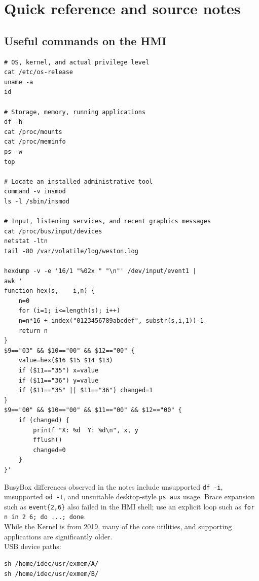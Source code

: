 \documentclass[10pt,letterpaper]{article}
\newcommand{\file}[1]{\nolinkurl{#1}}
\begin{document}
\newpage
\section{Quick reference and source notes}\label{refs}
\subsection{Useful commands on the HMI}
\begin{lstlisting}
# OS, kernel, and actual privilege level
cat /etc/os-release
uname -a
id

# Storage, memory, running applications
df -h
cat /proc/mounts
cat /proc/meminfo
ps -w
top

# Locate an installed administrative tool
command -v insmod
ls -l /sbin/insmod

# Input, listening services, and recent graphics messages
cat /proc/bus/input/devices
netstat -ltn
tail -80 /var/volatile/log/weston.log

hexdump -v -e '16/1 "%02x " "\n"' /dev/input/event1 |
awk '
function hex(s,    i,n) {
	n=0
	for (i=1; i<=length(s); i++)
	n=n*16 + index("0123456789abcdef", substr(s,i,1))-1
	return n
}
$9=="03" && $10=="00" && $12=="00" {
	value=hex($16 $15 $14 $13)
	if ($11=="35") x=value
	if ($11=="36") y=value
	if ($11=="35" || $11=="36") changed=1
}
$9=="00" && $10=="00" && $11=="00" && $12=="00" {
	if (changed) {
		printf "X: %d  Y: %d\n", x, y
		fflush()
		changed=0
	}
}'

\end{lstlisting}
BusyBox differences observed in the notes include unsupported \file{df -i},
unsupported \file{od -t}, and unsuitable desktop-style \file{ps aux} usage.
Brace expansion such as \file{event\{2,6\}} also failed in the HMI shell;
use an explicit loop such as \file{for n in 2 6; do ...; done}.\\
While the Kernel is from 2019, many of the core utilities, and supporting applications 
are significantly older. \\


USB device paths:
\begin{lstlisting}
sh /home/idec/usr/exmem/A/
sh /home/idec/usr/exmem/B/
\end{lstlisting}


\end{document}
